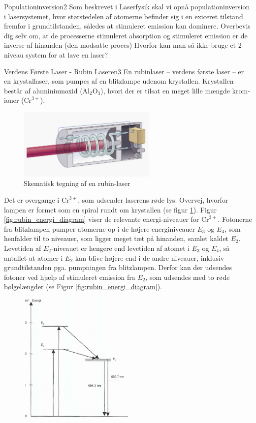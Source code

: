 \begin{opgave}{Populationinversion}{2}
Som beskrevet i Laserfysik skal vi opnå populationinversion i lasersystemet, hvor størstedelen af atomerne befinder sig i en exiceret tilstand fremfor i grundtilstanden, således at stimuleret emission kan dominere. 
\opg Overbevis dig selv om, at de processerne stimuleret absorption og stimuleret emission er de inverse af hinanden (den modsatte proces)
\opg Hvorfor kan man så ikke bruge et 2--niveau system for at lave en laser?
\end{opgave}

\begin{opgave}{Verdens Første Laser - Rubin Laseren}{3}
En rubinlaser -- verdens første laser -- er en krystallaser, som pumpes af en blitzlampe udenom krystallen. Krystallen består af aluminiumoxid ($\text{Al}_2\text{O}_3$), hvori der er tilsat en meget lille mængde krom-ioner ($\text{Cr}^{3+}$).
\begin{figure}[h!]
  \centering
  \includegraphics[width=0.6\textwidth]{Laserfysik/rubin_laser_diagram.jpg}
  \caption{Skematisk tegning af en rubin-laser}
  \label{fig:rubin_diagram}
\end{figure}
 Det er overgange i $\text{Cr}^{3+}$, som udsender laserens røde lys.
\opg Overvej, hvorfor lampen er formet som en spiral rundt om krystallen (se figur \ref{fig:rubin_diagram}).
\opg Figur \ref{fig:rubin_energi_diagram} viser de relevante energi-niveauer for $\text{Cr}^{3+}$. Fotonerne fra blitzlampen pumper atomerne op i de højere energiniveauer $E_3$ og $E_4$, som henfalder til to niveauer, som ligger meget tæt på hinanden, samlet kaldet $E_2$. Levetiden af $E_2$-niveauet er længere end levetiden af atomet i $E_3$ og $E_4$, så antallet at atomer i $E_2$ kan blive højere end i de andre niveauer, inklusiv grundtilstanden pga. pumpningen fra blitzlampen. Derfor kan der udsendes fotoner ved hjælp af stimuleret emission fra $E_2$, som udsendes med to røde bølgelængder (se Figur \ref{fig:rubin_energi_diagram}). 
\begin{figure}[h!]
  \centering
  \includegraphics[width=0.5\textwidth]{Laserfysik/rubin_energi}

\end{figure}
\end{opgave}
